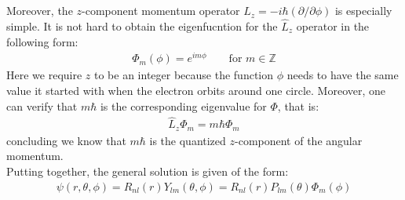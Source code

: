 \documentclass[11pt]{article}
\theoremstyle{break}
\theoremstyle{break}
\newcommand{\Z}{\mathbb{Z}}
\newcommand{\pd}{\partial}
\begin{document}
Moreover, the $z$-component momentum operator $\hat{L}_z=-i\hbar (\pd/\pd\phi)$ is especially simple. It is not hard to obtain the eigenfucntion for the $\hat{L}_z$ operator in the following form:
\begin{align*}
\Phi_m(\phi) = e^{im \phi}\qquad\text{for } m \in \Z
\end{align*}
Here we require $z$ to be an integer because the function $\phi$ needs to have the same value it started with when the electron orbits around one circle. Moreover, one can verify that $m\hbar$ is the corresponding eigenvalue for $\Phi$, that is:
\begin{align*}
\hat{L}_z \Phi_m = m\hbar \Phi_m
\end{align*}
concluding we know that $m\hbar$ is the quantized $z$-component of the angular momentum. \\

Putting together, the general solution is given of the form:
\begin{align*}
\psi(r,\theta, \phi) = R_{nl}(r) Y_{lm}(\theta, \phi) = R_{nl}(r) P_{lm}(\theta)\Phi_m(\phi)
\end{align*}
\end{document}
